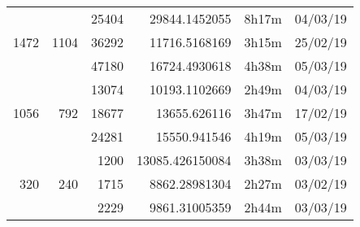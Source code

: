 \begin{center}
\begin{tabular}{ r r r | r r r }
  \hline
  \multirow{3}{*}{1472} & \multirow{3}{*}{1104} & 25404 & 29844.1452055 & 8h17m & 04/03/19 \\
  & & 36292 & 11716.5168169 & 3h15m & 25/02/19 \\
  & & 47180 & 16724.4930618 & 4h38m & 05/03/19 \\
  \hline
  \multirow{3}{*}{1056} & \multirow{3}{*}{792} & 13074 & 10193.1102669 & 2h49m & 04/03/19 \\
  & & 18677 & 13655.626116 & 3h47m & 17/02/19 \\
  & & 24281 & 15550.941546 & 4h19m & 05/03/19 \\
  \hline
  \multirow{3}{*}{320} & \multirow{3}{*}{240} & 1200 & 13085.426150084 & 3h38m & 03/03/19 \\
  & & 1715 & 8862.28981304 & 2h27m & 03/02/19 \\
  & & 2229 & 9861.31005359 & 2h44m & 03/03/19 \\
  \end{tabular}
  \end{center}

\newpage
